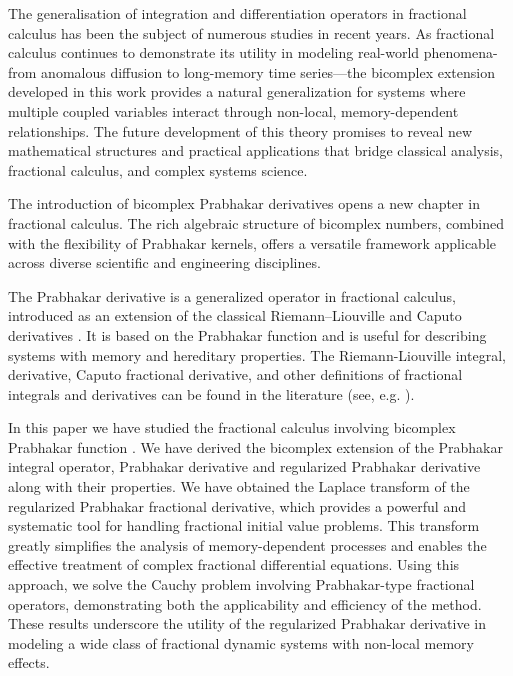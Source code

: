 \documentclass[a4paper,12pt]{article}
\theoremstyle{remark}
\begin{document}
\noindent The generalisation of integration and differentiation operators in fractional calculus has been the subject of numerous studies in recent years.
    As fractional calculus continues to demonstrate its utility in modeling real-world phenomena-from anomalous diffusion to long-memory time series—the bicomplex extension developed in this work provides a natural generalization for systems where multiple coupled variables interact through non-local, memory-dependent relationships. The future development of this theory promises to reveal new mathematical structures and practical applications that bridge classical analysis, fractional calculus, and complex systems science.

The introduction of bicomplex Prabhakar derivatives opens a new chapter in fractional calculus. The rich algebraic structure of bicomplex numbers, combined with the flexibility of Prabhakar kernels, offers a versatile framework applicable across diverse scientific and engineering disciplines.


The Prabhakar derivative is a generalized operator in fractional calculus, introduced as an extension of the classical Riemann–Liouville and Caputo derivatives \cite{kilbas2004generalized}. It is based on the Prabhakar function  and is useful for describing systems with memory and hereditary properties. The Riemann-Liouville integral, derivative, Caputo fractional derivative, and other definitions of fractional integrals and derivatives can be found in the literature (see, e.g. \cite{miller1993introduction,kibas1993,kilbas2006}).

\noindent In this paper we have studied the   fractional calculus involving  bicomplex Prabhakar function  \cite{ragarwal2025}. We have derived the  bicomplex extension of the  Prabhakar  integral operator, Prabhakar derivative and regularized Prabhakar derivative along with their properties.
We have obtained the Laplace transform of the regularized Prabhakar fractional derivative, which provides a powerful and systematic tool for handling fractional initial value problems. This transform greatly simplifies the analysis of memory-dependent processes and enables the effective treatment of complex fractional differential equations. Using this approach, we solve the Cauchy problem involving Prabhakar-type fractional operators, demonstrating both the applicability and efficiency of the method. These results underscore the utility of the regularized Prabhakar derivative in modeling a wide class of fractional dynamic systems with non-local memory effects. 
\end{document}
